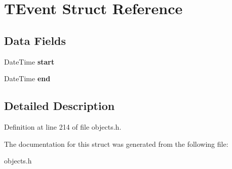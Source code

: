 \hypertarget{struct_t_event}{}\section{T\+Event Struct Reference}
\label{struct_t_event}
\subsection*{Data Fields}
\begin{DoxyCompactItemize}
\item 
\mbox{\label{struct_t_event_a6bf826080e1e9ab377af7beef1bc0391}} 
Date\+Time {\bfseries start}
\item 
\mbox{\label{struct_t_event_a443e677f3eae130f62f59270e44590f4}} 
Date\+Time {\bfseries end}
\end{DoxyCompactItemize}


\subsection{Detailed Description}


Definition at line 214 of file objects.\+h.



The documentation for this struct was generated from the following file\+:\begin{DoxyCompactItemize}
\item 
objects.\+h\end{DoxyCompactItemize}
